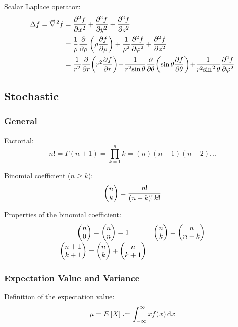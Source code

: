 			\noindent
			Scalar Laplace operator:
			\begin{equation}
				\begin{aligned}
					\Delta f = \Nabla^2 f &= \frac{\partial^2 f}{\partial x^2} + \frac{\partial^2 f}{\partial y^2} + \frac{\partial^2 f}{\partial z^2} \\
					&= \frac{1}{\rho} \frac{\partial}{\partial \rho}\left(\rho \frac{\partial f}{\partial \rho}\right)+ \frac{1}{\rho^2} \frac{\partial^2 f}{\partial \varphi^2}+ \frac{\partial^2 f}{\partial z^2} \\
					&= {\displaystyle \frac{1}{r^{2}} \frac{\partial }{\partial r}\!\left(r^{2}\frac{\partial f}{\partial r}\right)\!+\!\frac{1}{r^{2}\!\sin \theta } \frac{\partial }{\partial \theta }\!\left(\sin \theta \frac{\partial f}{\partial \theta }\right)\!+\!\frac{1}{r^{2}\!\sin ^{2}\theta }\frac{\partial ^{2}f}{\partial \varphi ^{2}}}
				\end{aligned}
			\end{equation}


	\subsection{Stochastic}
		\subsubsection{General}
			\noindent
			Factorial:
			\begin{equation}
				n!=\Gamma(n+1)=\prod_{k=1}^{n}k=(n)(n-1)(n-2)...
			\end{equation}

			\noindent
			Binomial coefficient ($n\ge k$):
			\begin{equation}
				\binomkoeff{n}{k} = \frac{n!}{\left(n-k\right)!\,k!}
			\end{equation}

			\noindent
			Properties of the binomial coefficient:
			\begin{equation}
				\begin{array}{cl}
					\binomkoeff{n}{0}=\binomkoeff{n}{n} = 1 & \binomkoeff{n}{k} = \binomkoeff{n}{n-k} \\ [8pt]
					\binomkoeff{n+1}{k+1}=\binomkoeff{n}{k}+\binomkoeff{n}{k+1}
				\end{array}
			\end{equation}

		\subsubsection{Expectation Value and Variance}
			\noindent
			Definition of the expectation value:
			\begin{equation}
				\mu = E\left[ X \right] \defeq \int_{-\infty}^{\infty} xf(x)\dd{x}
			\end{equation}

